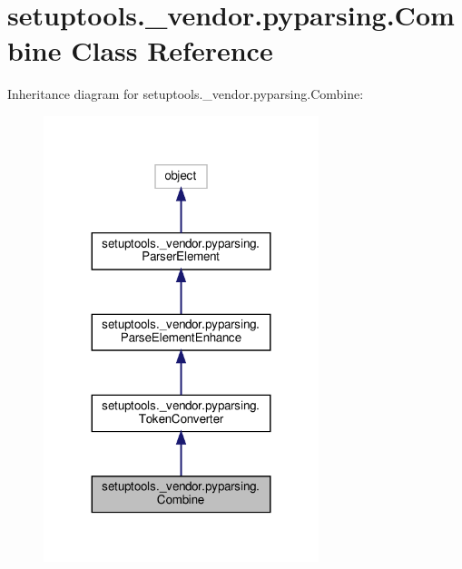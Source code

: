 \hypertarget{classsetuptools_1_1__vendor_1_1pyparsing_1_1Combine}{}\section{setuptools.\+\_\+vendor.\+pyparsing.\+Combine Class Reference}
\label{classsetuptools_1_1__vendor_1_1pyparsing_1_1Combine}


Inheritance diagram for setuptools.\+\_\+vendor.\+pyparsing.\+Combine\+:
\nopagebreak
\begin{figure}[H]
\begin{center}
\leavevmode
\includegraphics[width=227pt]{classsetuptools_1_1__vendor_1_1pyparsing_1_1Combine__inherit__graph}
\end{center}
\end{figure}



